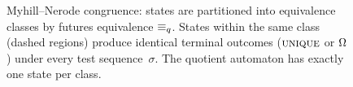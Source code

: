 \begin{figure}[ht]
\caption{Myhill--Nerode congruence: states are partitioned into equivalence classes
  by futures equivalence $\equiv_q$. States within the same class (dashed regions)
  produce identical terminal outcomes ($\textsc{unique}$ or $\Omega$) under every test
  sequence~$\sigma$. The quotient automaton has exactly one state per class.}
\label{fig:myhill-nerode}
\end{figure}
